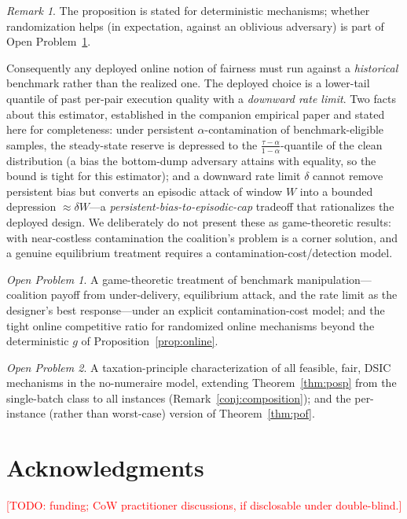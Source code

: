 \documentclass[11pt]{article}
\newcommand{\todo}[1]{\textcolor{red}{[TODO: #1]}}
\theoremstyle{remark}
\newtheorem{remark}{Remark}
\newtheorem{openproblem}{Open Problem}
\begin{document}
\begin{remark}
The proposition is stated for deterministic mechanisms; whether
randomization helps (in expectation, against an oblivious adversary) is
part of Open Problem~\ref{op:game}.
\end{remark}

Consequently any deployed online notion of fairness must run against a
\emph{historical} benchmark rather than the realized one. The deployed
choice is a lower-tail quantile of past per-pair execution quality with a
\emph{downward rate limit}. Two facts about this estimator, established in
the companion empirical paper \cite{companion} and stated here for
completeness: under persistent $\alpha$-contamination of
benchmark-eligible samples, the steady-state reserve is depressed to the
$\frac{\tau-\alpha}{1-\alpha}$-quantile of the clean distribution (a bias
the bottom-dump adversary attains with equality, so the bound is tight for
this estimator); and a downward rate limit $\delta$ cannot remove
persistent bias but converts an episodic attack of window $W$ into a
bounded depression $\approx\delta W$---a \emph{persistent-bias-to-episodic-cap}
tradeoff that rationalizes the deployed design. We deliberately do not
present these as game-theoretic results: with near-costless contamination
the coalition's problem is a corner solution, and a genuine equilibrium
treatment requires a contamination-cost/detection model.

\begin{openproblem}\label{op:game}
A game-theoretic treatment of benchmark manipulation---coalition payoff
from under-delivery, equilibrium attack, and the rate limit as the
designer's best response---under an explicit contamination-cost model; and
the tight online competitive ratio for randomized online mechanisms beyond
the deterministic $g$ of Proposition~\ref{prop:online}.
\end{openproblem}

\begin{openproblem}\label{op:characterization}
A taxation-principle characterization of all feasible, fair, DSIC
mechanisms in the no-numeraire model, extending Theorem~\ref{thm:posp}
from the single-batch class to all instances
(Remark~\ref{conj:composition}); and the per-instance (rather than
worst-case) version of Theorem~\ref{thm:pof}.
\end{openproblem}

\section*{Acknowledgments}
\todo{funding; CoW practitioner discussions, if disclosable under
double-blind.}
\end{document}
